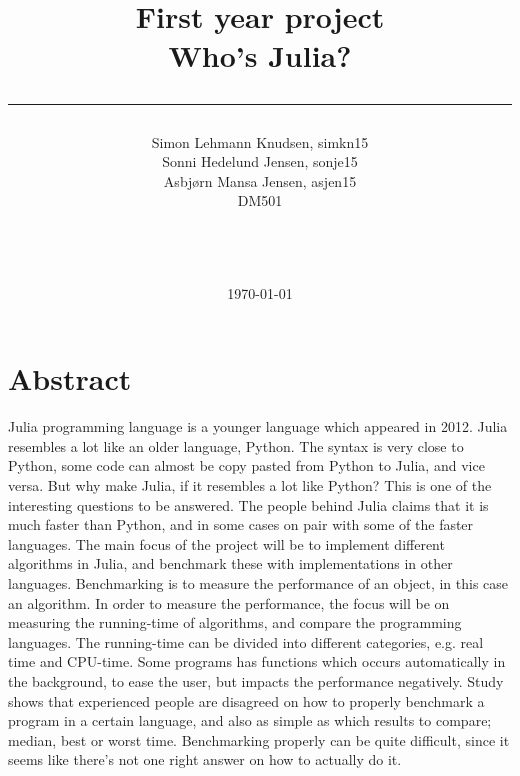 \documentclass[a4paper,11pt]{article}
\title{First year project\\Who's Julia?\\\rule{10cm}{0.5mm}}
\author{Simon Lehmann Knudsen, simkn15\\Sonni Hedelund Jensen, sonje15\\Asbjørn Mansa Jensen, asjen15
\\ DM501\\\rule{5.5cm}{0.5mm}\\}
\date{\today}
\begin{document}
\maketitle

\vfill

\newpage
\section*{Abstract}
Julia programming language is a younger language which appeared in 2012. Julia resembles a lot like an older language, Python. The syntax is very close to Python, some code can almost be copy pasted from Python to Julia, and vice versa. But why make Julia, if it resembles a lot like Python? This is one of the interesting questions to be answered. The people behind Julia claims that it is much faster than Python, and in some cases on pair with some of the faster languages. The main focus of the project will be to implement different algorithms in Julia, and benchmark these with implementations in other languages. Benchmarking is to measure the performance of an object, in this case an algorithm. In order to measure the performance, the focus will be on measuring the running-time of algorithms, and compare the programming languages. The running-time can be divided into different categories, e.g. real time and CPU-time. Some programs has functions which occurs automatically in the background, to ease the user, but impacts the performance negatively. Study shows that experienced people are disagreed on how to properly benchmark a program in a certain language, and also as simple as which results to compare; median, best or worst time. Benchmarking properly can be quite difficult, since it seems like there's not one right answer on how to actually do it.
\end{document}
